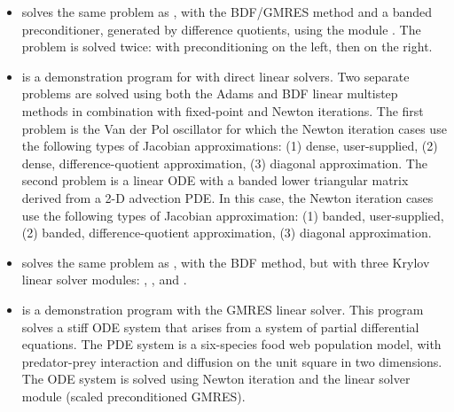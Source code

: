 \begin{itemize}
  \newline
  The problem is solved with the BDF/GMRES method (i.e.    
  using the {\sunlinsolspgmr} linear solver) and the block-diagonal part of the  
  Newton matrix as a left preconditioner. A copy of the block-diagonal 
  part of the Jacobian is saved and conditionally reused within the    
  preconditioner setup routine.
\item {}
  solves the same problem as , with the BDF/GMRES method 
  and a banded preconditioner, generated by difference quotients, 
  using the module {\cvbandpre}.
  \newline
  The problem is solved twice: with preconditioning on the left,
  then on the right.
\item {}
  is a demonstration program for {\cvodes} with direct linear solvers.
  \newline
  Two separate problems are solved using both the Adams and BDF linear
  multistep methods in combination with fixed-point and Newton
  iterations. 
  \newline
  The first problem is the Van der Pol oscillator for which 
  the Newton iteration cases use the following types of Jacobian approximations:
  (1) dense, user-supplied, (2) dense, difference-quotient approximation, 
  (3) diagonal approximation. The second problem is a linear ODE with a
  banded lower triangular matrix derived from a 2-D advection PDE. In this
  case, the Newton iteration cases use the following types of Jacobian
  approximation: (1) banded, user-supplied, (2) banded, difference-quotient
  approximation, (3) diagonal approximation.
\item {}
  solves the same problem as , with the BDF method, but with
  three Krylov linear solver modules: {\sunlinsolspgmr},
  {\sunlinsolspbcgs}, and {\sunlinsolsptfqmr}. 
\item {}
  is a demonstration program with the GMRES linear solver.
  \newline
  This program solves a stiff ODE system that arises from a system     
  of partial differential equations.  The PDE system is a six-species
  food web population model, with predator-prey interaction and diffusion 
  on the unit square in two dimensions.
  \newline
  The ODE system is solved using Newton iteration and the      
  {\sunlinsolspgmr} linear solver module (scaled preconditioned GMRES).

\end{itemize}
